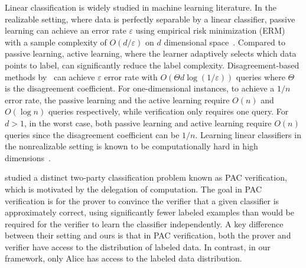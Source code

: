 Linear classification is widely studied in machine learning literature. 
In the realizable setting, where data is perfectly separable by a linear classifier, passive learning can achieve an error rate $\varepsilon$ using empirical risk minimization (ERM) with a sample complexity of $O(d/\varepsilon)$ on $d$ dimensional space~\citep{vapnik1998statistical}. Compared to passive learning, active learning, where the learner adaptively selects which data points to label, can significantly reduce the label complexity. Disagreement-based methods by~\citet*{balcan2006agnostic, hanneke2007bound} can achieve $\varepsilon$ error rate with $O(\Theta d\log (1/\varepsilon))$ queries where $\Theta$ is the disagreement coefficient.
For one-dimensional instances, to achieve a $1/n$ error rate, the passive learning and the active learning require $O(n)$ and $O(\log n)$ queries respectively, while verification only requires one query. For $d > 1$, in the worst case, both passive learning and active learning require $O(n)$ queries since the disagreement coefficient can be $1/n$.
Learning linear classifiers in the nonrealizable setting is known to be computationally hard in high dimensions~\citep*{kearns1994introduction,kalai2008agnostically,guruswami2009hardness}. 

\citet*{goldwasser2021interactive} studied a distinct two-party classification problem known as PAC verification, which is motivated by the delegation of computation. The goal in PAC verification is for the prover to convince the verifier that a given classifier is approximately correct, using significantly fewer labeled examples than would be required for the verifier to learn the classifier independently.
A key difference between their setting and ours is that in PAC verification, both the prover and verifier have access to the distribution of labeled data. In contrast, in our framework, only Alice has access to the labeled data distribution.


